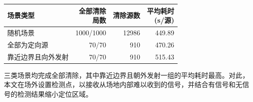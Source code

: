 \Needspace{40mm}
\begin{center}
\begin{minipage}{\linewidth}
\centering\small
{}
\label{tab:q4-main}
\vspace{4pt}
\begin{tabularx}{\linewidth}{@{}Xrrr@{}}
\toprule
场景类型 & \shortstack{全部清除\\局数} & 清除源数 & \shortstack{平均耗时\\(s/源)} \\
\midrule
随机场景 & 1000/1000 & 12986 & 449.89 \\
全部为定向源 & 70/70 & 910 & 470.26 \\
靠近边界且向外发射 & 70/70 & 910 & 515.43 \\
\bottomrule
\end{tabularx}
\end{minipage}
\end{center}

三类场景均完成全部清除，其中靠近边界且朝外发射一组的平均耗时最高。对此，本文在场外设置检测点，以接收从场地内部难以收到的信号，并结合有信号和无信号的检测结果缩小定位区域。
